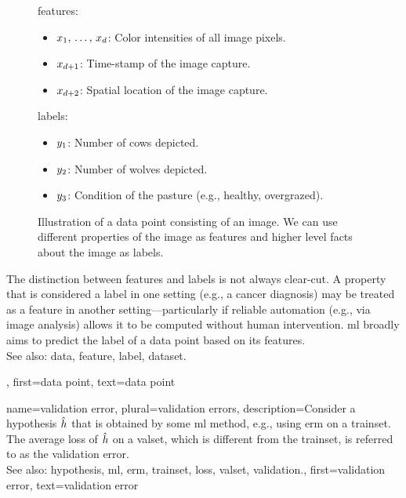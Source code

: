 {{\begin{figure}[H]
    			\begin{minipage}[t]{0.95\textwidth}
        			\Glspl{feature}:
        			\begin{itemize}
            			\item $x_{1}, \,\ldots, \,x_{d}$: Color intensities of all image pixels.
            			\item $x_{d+1}$: Time-stamp of the image capture.
            			\item $x_{d+2}$: Spatial location of the image capture.
			\end{itemize}
			\Glspl{label}:
            		\begin{itemize}
               	 		\item $y_{1}$: Number of cows depicted. 
                			\item $y_{2}$: Number of wolves depicted. 
                			\item $y_{3}$: Condition of the pasture (e.g., healthy, overgrazed).
            		\end{itemize}
    			\end{minipage}
    			\caption{Illustration of a \gls{data} point consisting of an image. We can use 
			different properties of the image as \glspl{feature} and higher level facts
			about the image as \glspl{label}.\label{fig:datapoint_cowherd_dict}}
		\end{figure}
 		The distinction between \glspl{feature} and \glspl{label} is not always clear-cut. 
 		A property that is considered a \gls{label} in one setting (e.g., a cancer diagnosis) 
 		may be treated as a \gls{feature} in another setting—particularly if reliable automation (e.g., 
 		via image analysis) allows it to be computed without human intervention.
   		\Gls{ml} broadly aims to predict the \gls{label} of a \gls{data} point based on its \glspl{feature}. 
				\\
		See also: \gls{data}, \gls{feature}, \gls{label}, \gls{dataset}.}, 
	first={data point},
	text={data point}  
}


{name={validation error}, plural={validation errors},
 	description={Consider a \gls{hypothesis} $\hat{h}$ that is 
 		obtained by some \gls{ml} method, e.g., using \gls{erm} on a \gls{trainset}. The average \gls{loss} 
 		of $\hat{h}$ on a \gls{valset}, which is different from the \gls{trainset}, is referred 
 		to as the \gls{validation} error.
			\\
		See also: \gls{hypothesis}, \gls{ml}, \gls{erm}, \gls{trainset}, \gls{loss}, \gls{valset}, \gls{validation}.},
	first={validation error},
	text={validation error}  
}

